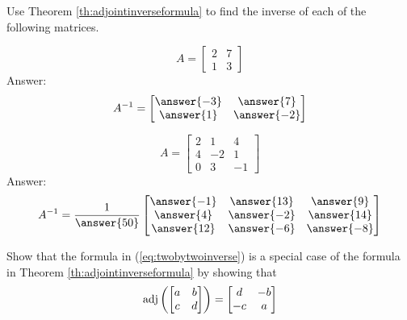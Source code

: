 \documentclass{ximera}
\begin{document}
\begin{problem}
Use Theorem \ref{th:adjointinverseformula} to find the inverse of each of the following matrices.
  \begin{problem}
  $$A=\begin{bmatrix}2&7\\1&3\end{bmatrix}$$
  Answer:
  $$A^{-1}=\begin{bmatrix}\answer{-3}&\answer{7}\\\answer{1}&\answer{-2}\end{bmatrix}$$
  \end{problem}
  
  \begin{problem}
  $$A=\begin{bmatrix}2&1&4\\4&-2&1\\0&3&-1\end{bmatrix}$$
  Answer:
  $$A^{-1}=\frac{1}{\answer{50}}\begin{bmatrix}\answer{-1}&\answer{13}&\answer{9}\\\answer{4}&\answer{-2}&\answer{14}\\\answer{12}&\answer{-6}&\answer{-8}\end{bmatrix}$$
  \end{problem}
\end{problem}

\begin{problem}
Show that the formula in (\ref{eq:twobytwoinverse}) is a special case of the formula in Theorem \ref{th:adjointinverseformula} by showing that 
$$\textnormal{adj}\left(\begin{bmatrix}a&b\\c&d\end{bmatrix}\right)=\begin{bmatrix}d&-b\\-c&a\end{bmatrix}$$
\end{problem}
\end{document}
